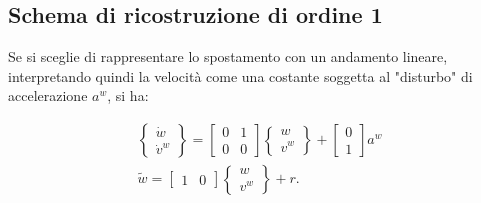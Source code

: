 \subsection{Schema di ricostruzione di ordine 1} 

Se si sceglie di rappresentare lo spostamento con un andamento lineare, interpretando quindi la velocità come una costante soggetta al "disturbo" di accelerazione $a^w$, si ha:

\begin{equation}
\label{eq:8filtro10}
\begin{array}{l}
\left\{
\begin{array}{c}
\dot{w}\\
\dot{v}^w\end{array}\right\} = \left[\begin{array}{cc}0&1\\0&0\end{array}\right]\left\{
\begin{array}{c}
w\\
v^w\end{array}\right\}+
\left[\begin{array}{c}0\\1\end{array}\right]a^w\\

\tilde{w} = \left[\begin{array}{cc} 1 &0\end{array}\right]\left\{
\begin{array}{c}
w\\
v^w\end{array}\right\} + r.
\end{array}
\end{equation}

